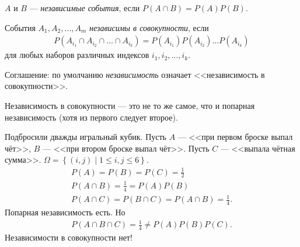 \begin{df}
 $A$ и $B$ --- \textit{независимые события}, если $P(A \cap B) = P(A)P(B)$.
\end{df}
\begin{df}
 События $A_1, A_2, \ldots, A_m$ \textit{независимы в совокупности}, если
 \begin{align*}
  P(A_{i_1} \cap A_{i_2} \cap \ldots \cap A_{i_k}) = P(A_{i_1}) P(A_{i_2}) \ldots P(A_{i_k})
 \end{align*} для любых наборов различных индексов $i_1, i_2, \ldots, i_k$.
\end{df}
Соглашение: по умолчанию \textit{независимость} означает <<независимость в совокупности>>.
\begin{remrk*}
 Независимость в совокупности --- это не то же самое, что и попарная независимость (хотя из первого следует второе).
\end{remrk*}
\begin{exmpl*}
 Подбросили дважды игральный кубик. Пусть $A$ --- <<при первом броске выпал чёт>>, $B$ --- <<при втором броске выпал чёт>>. Пусть $C$ --- <<выпала чётная сумма>>. $\Omega = \left\{ (i,j) \mid 1 \leqslant i,j \leqslant 6 \right\}$.
 \begin{align*}
  P(A) = P(B) = P(C) = \frac{1}{2} \\
  P(A \cap B) = \frac{1}{4} = P(A) P(B) \\
  P(A \cap C) = P(B \cap C) = P(A \cap B) = \frac{1}{4}
 .\end{align*} Попарная независимость есть. Но
 \begin{align*}
  P(A \cap B \cap C) = \frac{1}{4} \neq P(A)P(B)P(C)
 .\end{align*} Независимости в совокупности нет!
\end{exmpl*}

